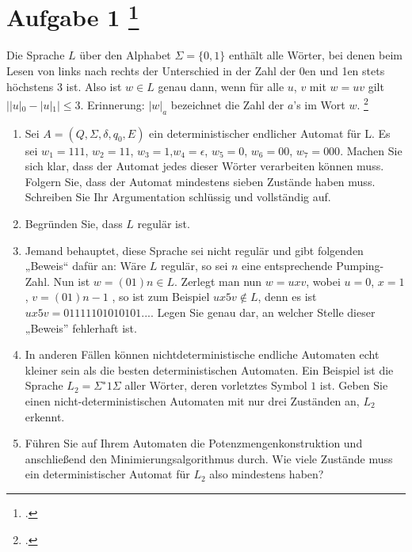 \documentclass{lehramt-informatik-aufgabe}
\begin{document}
\liAufgabenTitel{}
\section{Aufgabe 1
\footcite{66115:2015:03}}

Die Sprache $L$ über den Alphabet $\Sigma = \{0, 1\}$ enthält alle
Wörter, bei denen beim Lesen von links nach rechts der Unterschied in
der Zahl der 0en und 1en stets höchstens 3 ist. Also ist $w \in L$ genau
dann, wenn für alle $u$, $v$ mit $w = uv$ gilt $||u|_0 − |u|_1| \leq 3$.
Erinnerung: $|w|_a$ bezeichnet die Zahl der $a$’s im Wort $w$.
\footcite{theo:ab:1}

\begin{enumerate}


\item Sei $A = (Q, \Sigma, \delta, q_0 , E)$ ein deterministischer
endlicher Automat für L. Es sei $w_1 = 111$, $w_2 = 11$, $w_3 = 1$,$ w_4
= \epsilon$, $w_5 = 0$, $w_6 = 00$, $w_7 = 000$. Machen Sie sich klar,
dass der Automat jedes dieser Wörter verarbeiten können muss. Folgern
Sie, dass der Automat mindestens sieben Zustände haben muss. Schreiben
Sie Ihr Argumentation schlüssig und vollständig auf.


\item Begründen Sie, dass $L$ regulär ist.


\item Jemand behauptet, diese Sprache sei nicht regulär und gibt
folgenden „Beweis“ dafür an: Wäre $L$ regulär, so sei $n$ eine
entsprechende Pumping-Zahl. Nun ist $w = (01) n \in L$. Zerlegt man nun
$w = uxv$, wobei $u = 0$, $x = 1$, $v = (01) n−1$ , so ist zum Beispiel
$ux 5 v \notin L$, denn es ist $ux 5 v = 01111101010101$.... Legen Sie
genau dar, an welcher Stelle dieser „Beweis” fehlerhaft ist.


\item In anderen Fällen können nichtdeterministische endliche Automaten
echt kleiner sein als die besten deterministischen Automaten. Ein
Beispiel ist die Sprache $L_2 = \Sigma^∗ 1 \Sigma$ aller Wörter, deren
vorletztes Symbol $1$ ist. Geben Sie einen nicht-deterministischen
Automaten mit nur drei Zuständen an, $L_2$ erkennt.


\item Führen Sie auf Ihrem Automaten die Potenzmengenkonstruktion und
anschließend den Minimierungsalgorithmus durch. Wie viele Zustände
muss ein deterministischer Automat für $L_2$ also mindestens haben?
\end{enumerate}
\end{document}
